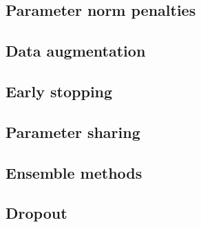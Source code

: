     \subsection{Parameter norm penalties}

    \subsection{Data augmentation}

    \subsection{Early stopping}

    \subsection{Parameter sharing}

    \subsection{Ensemble methods}

    \subsection{Dropout}

    


